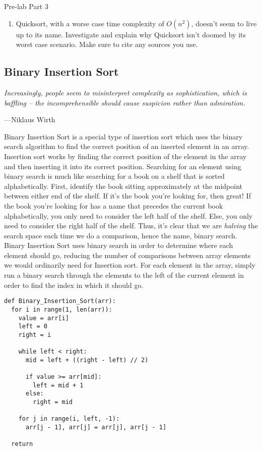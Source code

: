 \documentclass[11pt]{article}
\begin{document}
\medskip
\begin{prelab}{Pre-lab Part 3}
    \begin{enumerate}
    \item Quicksort, with a worse case time complexity of $O(n^2)$, doesn't seem
        to live up to its name. Investigate and explain why Quicksort isn't
        doomed by its worst case scenario.  Make sure to cite any sources you
        use.
    \end{enumerate}
\end{prelab}

\subsection{Binary Insertion Sort}
\epigraph{\emph{Increasingly, people seem to misinterpret complexity as
sophistication, which is baffling -- the incomprehensible should cause
suspicion rather than admiration.}}{---Niklaus Wirth}


\noindent Binary Insertion Sort is a special type of insertion sort which uses
the binary search algorithm to find the correct position of an inserted element
in an array. Insertion sort works by finding the correct position of the element
in the array and then inserting it into its correct position. Searching for an
element using binary search is much like searching for a book on a shelf that is
sorted alphabetically. First, identify the book sitting approximately at the
midpoint between either end of the shelf. If it's the book you're looking for,
then great! If the book you're looking for has a name that precedes the current
book alphabetically, you only need to consider the left half of the shelf. Else,
you only need to consider the right half of the shelf.  Thus, it's clear that we
are \emph{halving} the search space each time we do a comparison, hence the
name, binary search. Binary Insertion Sort uses binary search in order to
determine where each element should go, reducing the number of comparisons
between array elements we would ordinarily need for Insertion sort.  For each
element in the array, simply run a binary search through the elements to the
left of the current element in order to find the index in which it should go.

\begin{lstlisting}[title=Binary Insertion Sort (pseudocode)]
def Binary_Insertion_Sort(arr):
  for i in range(1, len(arr)):
    value = arr[i]
    left = 0
    right = i

    while left < right:
      mid = left + ((right - left) // 2)

      if value >= arr[mid]:
        left = mid + 1
      else:
        right = mid

    for j in range(i, left, -1):
      arr[j - 1], arr[j] = arr[j], arr[j - 1]

  return
\end{lstlisting}
\end{document}
